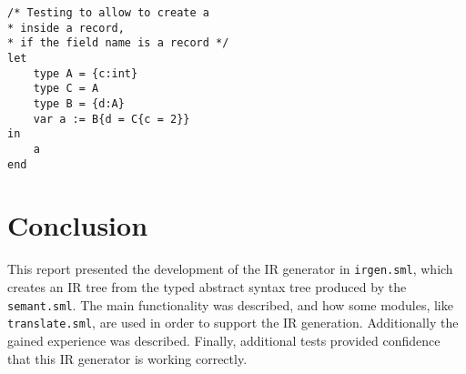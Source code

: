 \documentclass{article}
\begin{document}
\begin{lstlisting}[frame=single]
/* Testing to allow to create a
* inside a record,
* if the field name is a record */
let
	type A = {c:int}
	type C = A
	type B = {d:A}
	var a := B{d = C{c = 2}}
in
	a
end
\end{lstlisting}


\section{Conclusion}
This report presented the development of the IR generator in \texttt{irgen.sml}, which creates an IR tree from the typed abstract syntax tree produced by the \texttt{semant.sml}. The main functionality was described, and how some modules, like \texttt{translate.sml}, are used in order to support the IR generation. Additionally the gained experience was described. Finally, additional tests provided confidence that this IR generator is working correctly.
\end{document}
